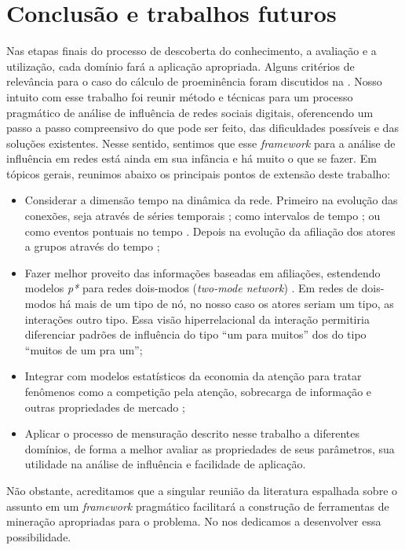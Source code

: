 \chapter{Conclusão e trabalhos futuros}
\label{ch:conclusao}

Nas etapas finais do processo de descoberta do conhecimento, a avaliação e a
utilização, cada domínio fará a aplicação apropriada. Alguns critérios de
relevância para o caso do cálculo de proeminência foram discutidos na
. Nosso intuito com esse trabalho foi reunir método e
técnicas para um processo pragmático de análise de influência de redes sociais
digitais, oferencendo um passo a passo compreensivo do que pode ser feito, das
dificuldades possíveis e das soluções existentes. Nesse sentido, sentimos que
esse \emph{framework} para a análise de influência em redes está ainda em sua
infância e há muito o que se fazer. Em tópicos gerais, reunimos abaixo os
principais pontos de extensão deste trabalho:

\begin{itemize}
  \item Considerar a dimensão tempo na dinâmica da rede. Primeiro na
  evolução das conexões, seja através de séries temporais \citep{Snijders1996};
  como intervalos de tempo \citep{Butts2004}; ou como eventos pontuais no tempo
  \citep{Butts2008a}. Depois na evolução da afiliação dos atores a grupos
  através do tempo \citep{Berger-Wolf2006};
  \item Fazer melhor proveito das informações baseadas em afiliações, estendendo
  modelos \emph{p*} para redes dois-modos (\emph{two-mode network})
  \citep{Field2006}. Em redes de dois-modos há mais de um tipo de nó, no nosso
  caso os atores seriam um tipo, as interações outro tipo. Essa visão
  hiperrelacional da interação permitiria diferenciar padrões de influência do
  tipo ``um para muitos'' dos do tipo ``muitos de um pra um'';
  \item Integrar com modelos estatísticos da economia da atenção para tratar
  fenômenos como a competição pela atenção, sobrecarga de informação e outras
  propriedades de mercado \citep{Falkinger2007}; 
  \item Aplicar o processo de mensuração descrito nesse trabalho a diferentes
  domínios, de forma a melhor avaliar as propriedades de seus parâmetros, sua
  utilidade na análise de influência e facilidade de aplicação.
\end{itemize}

Não obstante, acreditamos que a singular reunião da literatura espalhada sobre
o assunto em um \emph{framework} pragmático facilitará a construção de
ferramentas de mineração apropriadas para o problema. No  nos
dedicamos a desenvolver essa possibilidade.
